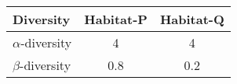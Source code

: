 \begin{center}
\begin{tabular}{|l|c|c|}
\hline
Diversity & Habitat-P & Habitat-Q \\
\hline
$\alpha$-diversity & 4 & 4 \\
$\beta$-diversity & 0.8 & 0.2 \\
\hline
\end{tabular}
\end{center}